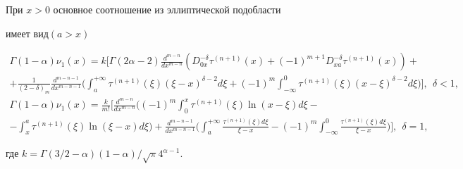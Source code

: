  


 


\begin{lem} 


При $x>0$ основное соотношение из эллиптической подобласти 


имеет вид\linebreak $(a>x)$ 


\begin{gather*}


\Gamma(1-\alpha)\nu_1(x)=k\bigg[\Gamma(2\alpha-2) 


\frac{d^{m-n}}{dx^{m-n}}(D^{-\delta}_{0x}\tau^{(n+1)}(x) 


+(-1)^{m+1}D^{-\delta}_{xa}\tau^{(n+1)}(x))+\\ 


% 


+\frac{1}{(2-\delta)_m}\frac{d^{m-n-1}}{dx^{m-n-1}}\bigg( 


\int^{+\infty}_a \tau^{(n+1)}(\xi)(\xi-x)^{\delta-2}d\xi+ 


(-1)^m\int^0_{-\infty}\tau^{(n+1)}(\xi)(x-\xi)^{\delta-2} 


d\xi\bigg)\bigg],\ \ \delta<1,\\ 


% 


\Gamma(1-\alpha)\nu_1(x)=\frac{k}{m!}\bigg[ 


\frac{d^{m-n}}{dx^{m-n}}\bigg((-1)^m\int^x_0 


\tau^{(n+1)}(\xi)\ln(x-\xi)d\xi-\\ 


% 


-\int^a_x \tau^{(n+1)}(\xi)\ln(\xi-x)d\xi\bigg)+ 


\frac{d^{m-n-1}}{dx^{m-n-1}}\bigg(\int^{+\infty}_a 


\frac{\tau^{(n+1)}(\xi)d\xi}{\xi-x}-(-1)^m\int^0_{-\infty} 


\frac{\tau^{(n+1)}(\xi)d\xi}{\xi-x}\bigg)\bigg],\ \ \delta=1, 


\end{gather*} 


где $k=\Gamma(3/2-\alpha)(1-\alpha)/\sqrt{\pi}4^{\alpha-1}$. 


\end{lem} 


 


 


